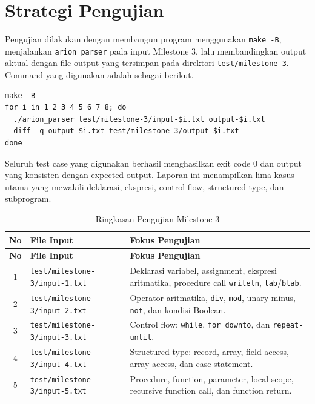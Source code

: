 \section{Strategi Pengujian}
Pengujian dilakukan dengan membangun program menggunakan \texttt{make -B}, menjalankan \texttt{arion\_parser} pada input Milestone 3, lalu membandingkan output aktual dengan file output yang tersimpan pada direktori \texttt{test/milestone-3}. Command yang digunakan adalah sebagai berikut.

\begin{tcolorbox}[title=Command Pengujian,colback=gray!5,colframe=black!60,boxrule=0.5pt,arc=2mm]
\begin{verbatim}
make -B
for i in 1 2 3 4 5 6 7 8; do
  ./arion_parser test/milestone-3/input-$i.txt output-$i.txt
  diff -q output-$i.txt test/milestone-3/output-$i.txt
done
\end{verbatim}
\end{tcolorbox}

Seluruh test case yang digunakan berhasil menghasilkan exit code 0 dan output yang konsisten dengan expected output. Laporan ini menampilkan lima kasus utama yang mewakili deklarasi, ekspresi, control flow, structured type, dan subprogram.

\begin{longtable}{|c|p{4.8cm}|p{7.8cm}|}
\caption{Ringkasan Pengujian Milestone 3} \label{tab:ringkasan-m3} \\
\hline
\textbf{No} & \textbf{File Input} & \textbf{Fokus Pengujian} \\
\hline
\endfirsthead
\hline
\textbf{No} & \textbf{File Input} & \textbf{Fokus Pengujian} \\
\hline
\endhead
1 & \texttt{test/milestone-3/input-1.txt} & Deklarasi variabel, assignment, ekspresi aritmatika, procedure call \texttt{writeln}, \texttt{tab}/\texttt{btab}. \\
\hline
2 & \texttt{test/milestone-3/input-2.txt} & Operator aritmatika, \texttt{div}, \texttt{mod}, unary minus, \texttt{not}, dan kondisi Boolean. \\
\hline
3 & \texttt{test/milestone-3/input-3.txt} & Control flow: \texttt{while}, \texttt{for downto}, dan \texttt{repeat-until}. \\
\hline
4 & \texttt{test/milestone-3/input-4.txt} & Structured type: record, array, field access, array access, dan case statement. \\
\hline
5 & \texttt{test/milestone-3/input-5.txt} & Procedure, function, parameter, local scope, recursive function call, dan function return. \\
\hline
\end{longtable}

